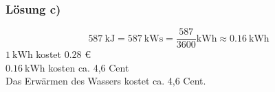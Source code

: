 \documentclass{beamer}
\begin{document}
\frame
{
  \frametitle{Lösung c)}
  \begin{equation*}
  \SI{587}{\kilo\joule}=\SI{587}{\kilo\watt\second}=\dfrac{587}{3600} \si{\kilo\watt\hour}\approx\SI{0.16}{\kilo\watt\hour}
  \end{equation*}
	$\SI{1}{\kilo\watt\hour}$ kostet $0.28$ \euro \\
	$\SI{0.16}{\kilo\watt\hour}$ kosten ca. 4,6 Cent \\
  	Das Erwärmen des Wassers kostet ca. 4,6 Cent.
}
\end{document}
